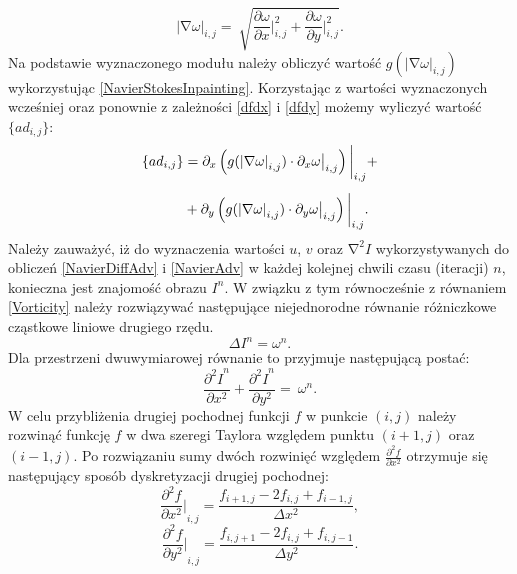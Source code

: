\documentclass[12pt, twoside, openany]{report}
\theoremstyle{definition}
\begin{document}
\begin{equation}
{\left|\mathrm{\nabla }\omega \right|}_{i,j}=\ \sqrt{\frac{\partial \omega }{\partial x}\bigg|^2_{i,j}+\frac{\partial \omega }{\partial y}\bigg|^2_{i,j}}
\label{magnitudedw}
.
\end{equation}
Na podstawie wyznaczonego modułu należy obliczyć wartość $g{\left({\left|\mathrm{\nabla }\omega \right|}_{i,j}\right)}$ wykorzystując \eqref{NavierStokesInpainting}. Korzystając z wartości wyznaczonych wcześniej oraz ponownie z zależności \eqref{dfdx} i \eqref{dfdy} możemy wyliczyć wartość $\{ad_{i,j}\} $:
\begin{align}
\{ad_{i,j}\} &= \partial_x \left( g(\left| \nabla\omega \right|_{i,j}) \cdot \partial_x \omega \big|_{i,j} \right) \bigg|_{i,j} \notag +\\[1ex]
&+ \partial_y \left( g(\left|\nabla\omega\right|_{i,j}) \cdot \partial_y \omega \big|_{i,j} \right)\bigg|_{i,j}.
\label{discreteAnisotropic}
\end{align}
Należy zauważyć, iż do wyznaczenia wartości $u$, $v$ oraz ${\mathrm{\nabla }}^2I$ wykorzystywanych do obliczeń \eqref{NavierDiffAdv} i \eqref{NavierAdv} w każdej kolejnej chwili czasu (iteracji) $n$, konieczna jest znajomość obrazu $I^n$. W związku z tym równocześnie z równaniem \eqref{Vorticity} należy rozwiązywać następujące niejednorodne równanie różniczkowe cząstkowe liniowe drugiego rzędu.
\begin{equation}
\Delta I^n={\omega }^n
\label{Poisson}
.
\end{equation}
Dla przestrzeni dwuwymiarowej równanie to przyjmuje następującą postać:
\begin{equation}
\frac{{{\partial }^2I}^n}{\partial x^2}+\frac{{{\partial }^2I}^n}{\partial y^2}=\ \omega^n
\label{Poisson2D}
.
\end{equation}
W celu przybliżenia drugiej pochodnej funkcji $f$ w punkcie $(i,j)$ należy rozwinąć funkcję $f$ w dwa szeregi Taylora względem punktu $(i+1,j)$ oraz $(i-1,j)$. Po rozwiązaniu sumy dwóch rozwinięć względem $\frac{{\partial }^2f}{\partial x^2}$ otrzymuje się następujący sposób dyskretyzacji drugiej pochodnej:
\begin{equation}
{\frac{{\partial }^2f}{\partial x^2}\bigg|}_{i,j}\mathrm{=}\frac{f_{i+1,j}-2f_{i,j}+f_{i-1,j}}{\Delta x^2}
\label{d2fdx2}
,
\end{equation}
\begin{equation}
{\frac{{\partial }^2f}{\partial y^2}\bigg|}_{i,j}\mathrm{=}\frac{f_{i,j+1}-2f_{i,j}+f_{i,j-1}}{\Delta y^2}
\label{d2fdy2}
.
\end{equation}
\end{document}
